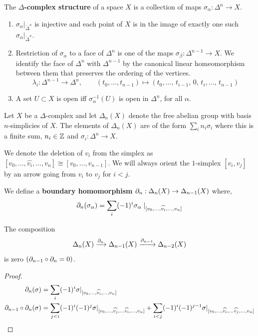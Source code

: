 \documentclass[12pt]{amsart}
\begin{document}
\begin{definition}
    The \textbf{$\Delta$-complex structure} of a space $X$ is a collection of maps $\sigma_\alpha: \Delta^n \to X$. 
    \begin{enumerate}
        \item $\sigma_\alpha |_{\mathring{\Delta}^{n}}$ is injective and each point of $X$ is in the image of exactly one such $\sigma_\alpha |_{\mathring{\Delta}^{n}}$. 
        \item Restriction of $\sigma_\alpha$ to a face of ${\Delta}^{n}$  is one of the maps $\sigma_\beta: \Delta^{n-1} \to X$. We identify the face of $\Delta^n$ with $\Delta^{n-1}$ by the canonical linear homeomorphism between them that preserves the ordering of the vertices.
        \[\lambda_i: \Delta^{n-1} \to \Delta^n, \qquad (t_0, \ldots, t_{n-1}) \mapsto (t_0, \ldots,\, t_{i-1}, \, 0 , \, t_i, \ldots,\, t_{n-1} )\]
        \item A set $U \subset X$ is open iff $\sigma_\alpha^{-1} (U)$ is open in $\Delta^n$, for all $\alpha$.
    \end{enumerate}
\end{definition}


\begin{definition}
    Let $X$ be a $\Delta$-complex and let $\Delta_n(X)$ denote the free abelian group with basis $n$-simplicies of $X$. The elements of $\Delta_n(X)$ are of the form $\sum_i n_i \sigma_i$ where this is a finite sum, $n_i \in \mathbb Z$ and $\sigma_i: \Delta^n \to X$. 
\end{definition}

We denote the deletion of $v_i$ from the simplex as $[v_0, \ldots, \widehat{v_i}, \ldots, v_n] \cong [v_0, \ldots, v_{n-1}]$. We will always orient the $1$-simplex $[v_i, v_j]$ by an arrow going from $v_i$ to $v_j$ for $i < j$. 

\begin{definition}
    We define a \textbf{boundary homomorphism} $\partial_n: \Delta_n(X) \to \Delta_{n-1}(X)$ where, 
    \[\partial_n(\sigma_\alpha) = \sum_i (-1)^i \sigma_\alpha \mid _{[v_0, \ldots, \widehat{v_i}, \ldots, v_n]}\]
\end{definition}
\begin{proposition}
    The composition 
    \[\Delta_n(X) \xrightarrow{\partial_n} \Delta_{n-1}(X) \xrightarrow{\partial_{n-1}} \Delta_{n-2}(X)\] 
    is zero $(\partial_{n-1} \circ \partial_n = 0)$.
\end{proposition}

\begin{proof}
    \begin{align*}
        \partial_n(\sigma) &= \sum_i(-1)^i \sigma |_{[v_0, \ldots, \widehat{v_i}, \ldots, v_n]} \\ 
        \partial_{n-1} \circ \partial_n (\sigma) &= \sum_{j <i}(-1)^i(-1)^j \sigma |_{[v_0, \ldots, \widehat{v_j}, \ldots \widehat{v_i}, \ldots, v_n]} +\sum_{i < j}(-1)^i(-1)^{j-1} \sigma |_{[v_0, \ldots, \widehat{v_i}, \ldots \widehat{v_j}, \ldots, v_n]}  \\
    \end{align*}
\end{proof}
\end{document}
